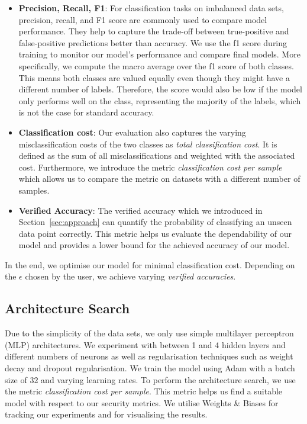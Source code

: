 \documentclass[acmsmall,nonacm]{acmart}
\begin{document}
\begin{itemize}
	\item \textbf{Precision, Recall, F1}: For classification tasks on imbalanced data sets, precision, recall, and F1 score are commonly used to compare model performance. They help to capture the trade-off between true-positive and false-positive predictions better than accuracy. We use the f1 score during training to monitor our model's performance and compare final models. More specifically, we compute the macro average over the f1 score of both classes. This means both classes are valued equally even though they might have a different number of labels. Therefore, the score would also be low if the model only performs well on the class, representing the majority of the labels, which is not the case for standard accuracy.
	\item \textbf{Classification cost}: Our evaluation also captures the varying misclassification costs of the two classes as \textit{total classification cost}. It is defined as the sum of all misclassifications and weighted with the associated cost. Furthermore, we introduce the metric \textit{classification cost per sample} which allows us to compare the metric on datasets with a different number of samples. 
	\item \textbf{Verified Accuracy}: The verified accuracy which we introduced in Section~\ref{sec:approach} can quantify the probability of classifying an unseen data point correctly. This metric helps us evaluate the dependability of our model and provides a lower bound for the achieved accuracy of our model. 
\end{itemize}

In the end, we optimise our model for minimal classification cost. Depending on the $\epsilon$ chosen by the user, we achieve varying \textit{verified accuracies}.

\subsection{Architecture Search}
Due to the simplicity of the data sets, we only use simple multilayer perceptron (MLP) architectures. We experiment with between 1 and 4 hidden layers and different numbers of neurons as well as regularisation techniques such as weight decay and dropout regularisation. We train the model using Adam with a batch size of 32 and varying learning rates. To perform the architecture search, we use the metric \textit{classification cost per sample}. This metric helps us find a suitable model with respect to our security metrics. We utilise Weights \& Biases \cite{wandb} for tracking our experiments and for visualising the results. 
\end{document}

